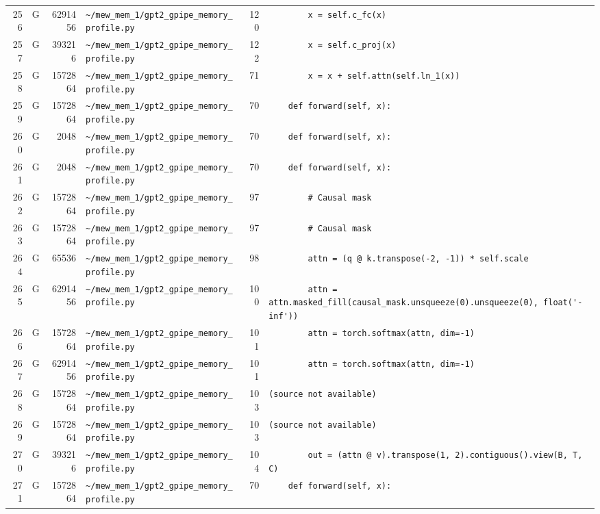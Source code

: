 \documentclass{article}
\begin{document}
\begin{longtable}{r l r p{6.5cm} r p{7.0cm}}
256 & G & 6291456 & \lstinline|~/mew_mem_1/gpt2_gpipe_memory_profile.py| & 120 & \lstinline|        x = self.c_fc(x)| \\
257 & G & 393216 & \lstinline|~/mew_mem_1/gpt2_gpipe_memory_profile.py| & 122 & \lstinline|        x = self.c_proj(x)| \\
258 & G & 1572864 & \lstinline|~/mew_mem_1/gpt2_gpipe_memory_profile.py| & 71 & \lstinline|        x = x + self.attn(self.ln_1(x))| \\
259 & G & 1572864 & \lstinline|~/mew_mem_1/gpt2_gpipe_memory_profile.py| & 70 & \lstinline|    def forward(self, x):| \\
260 & G & 2048 & \lstinline|~/mew_mem_1/gpt2_gpipe_memory_profile.py| & 70 & \lstinline|    def forward(self, x):| \\
261 & G & 2048 & \lstinline|~/mew_mem_1/gpt2_gpipe_memory_profile.py| & 70 & \lstinline|    def forward(self, x):| \\
262 & G & 1572864 & \lstinline|~/mew_mem_1/gpt2_gpipe_memory_profile.py| & 97 & \lstinline|        # Causal mask| \\
263 & G & 1572864 & \lstinline|~/mew_mem_1/gpt2_gpipe_memory_profile.py| & 97 & \lstinline|        # Causal mask| \\
264 & G & 65536 & \lstinline|~/mew_mem_1/gpt2_gpipe_memory_profile.py| & 98 & \lstinline|        attn = (q @ k.transpose(-2, -1)) * self.scale| \\
265 & G & 6291456 & \lstinline|~/mew_mem_1/gpt2_gpipe_memory_profile.py| & 100 & \lstinline|        attn = attn.masked_fill(causal_mask.unsqueeze(0).unsqueeze(0), float('-inf'))| \\
266 & G & 1572864 & \lstinline|~/mew_mem_1/gpt2_gpipe_memory_profile.py| & 101 & \lstinline|        attn = torch.softmax(attn, dim=-1)| \\
267 & G & 6291456 & \lstinline|~/mew_mem_1/gpt2_gpipe_memory_profile.py| & 101 & \lstinline|        attn = torch.softmax(attn, dim=-1)| \\
268 & G & 1572864 & \lstinline|~/mew_mem_1/gpt2_gpipe_memory_profile.py| & 103 & \lstinline|(source not available)| \\
269 & G & 1572864 & \lstinline|~/mew_mem_1/gpt2_gpipe_memory_profile.py| & 103 & \lstinline|(source not available)| \\
270 & G & 393216 & \lstinline|~/mew_mem_1/gpt2_gpipe_memory_profile.py| & 104 & \lstinline|        out = (attn @ v).transpose(1, 2).contiguous().view(B, T, C)| \\
271 & G & 1572864 & \lstinline|~/mew_mem_1/gpt2_gpipe_memory_profile.py| & 70 & \lstinline|    def forward(self, x):| \\

\end{longtable}
\end{document}
